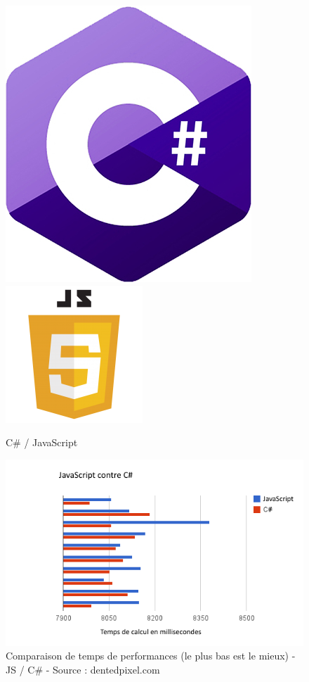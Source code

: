 \documentclass[a4paper]{article}
\begin{document}
    \begin{figure}[H]
        \centering
        \includegraphics[scale=0.2]{img/logo-csharp}
        \hspace{10pt}
        \includegraphics[scale=0.45]{img/logo-javascript}
        \caption{C\# / JavaScript}
    \end{figure}

    \begin{figure}[H]
        \centering 
        \includegraphics[scale=0.55]{img/CSharp-JS-Benchmark}
        \caption{Comparaison de temps de performances (le plus bas est le mieux) - JS / C\# - Source : dentedpixel.com}
    \end{figure}
\end{document}
